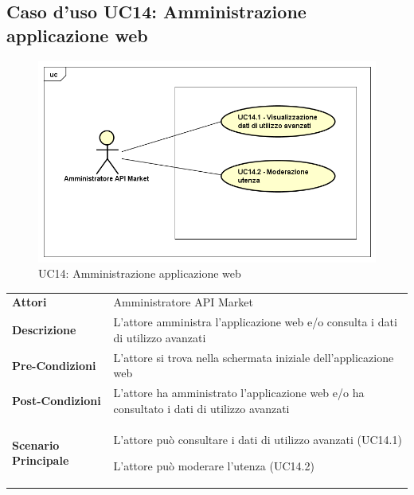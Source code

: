 \newpage
\subsection{Caso d'uso UC14: Amministrazione applicazione web}
\label{UC14}
\begin{figure}[ht]
	\centering
	\includegraphics[scale=0.45]{UML/UC14.png}
	\caption{UC14: Amministrazione applicazione web}
\end{figure}

\begin{longtable}{ l | p{11cm}}
	\hline
	\rowcolor{Gray}
	\multicolumn{2}{c}{UC14: Amministrazione applicazione web} \\
	\hline
	\textbf{Attori} & Amministratore API Market \\
	\textbf{Descrizione} & L'attore amministra l'applicazione web e/o consulta i dati di utilizzo avanzati \\
	\textbf{Pre-Condizioni} & L'attore si trova nella schermata iniziale dell'applicazione web \\
	\textbf{Post-Condizioni} & L'attore ha amministrato l'applicazione web e/o ha consultato i dati di utilizzo avanzati \\
	\textbf{Scenario Principale} & 
	\begin{enumerate*}[label=(\arabic*.),itemjoin={\newline}]
		\item L'attore può consultare i dati di utilizzo avanzati (UC14.1)
		\item L'attore può moderare l'utenza (UC14.2)
	\end{enumerate*}\\
\end{longtable}

\newpage
